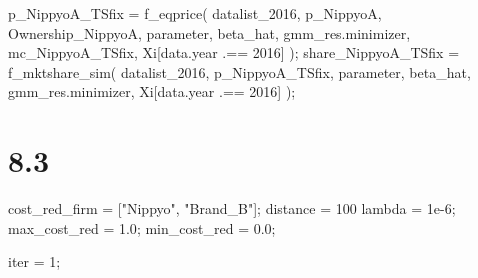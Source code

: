 \documentclass[
  letterpaper,
  DIV=11,
  numbers=noendperiod]{scrreprt}
\newenvironment{Shaded}{\begin{snugshade}}{\end{snugshade}}
\newcommand{\FloatTok}[1]{\textcolor[rgb]{0.68,0.00,0.00}{#1}}
\newcommand{\FunctionTok}[1]{\textcolor[rgb]{0.28,0.35,0.67}{#1}}
\newcommand{\NormalTok}[1]{\textcolor[rgb]{0.00,0.23,0.31}{#1}}
\newcommand{\OperatorTok}[1]{\textcolor[rgb]{0.37,0.37,0.37}{#1}}
\newcommand{\StringTok}[1]{\textcolor[rgb]{0.13,0.47,0.30}{#1}}
\begin{document}
\begin{Shaded}
\begin{Highlighting}[]
\NormalTok{p\_NippyoA\_TSfix }\OperatorTok{=} \FunctionTok{f\_eqprice}\NormalTok{(}
\NormalTok{    datalist\_2016, }
\NormalTok{    p\_NippyoA, }
\NormalTok{    Ownership\_NippyoA, }
\NormalTok{    parameter, }
\NormalTok{    beta\_hat, }
\NormalTok{    gmm\_res.minimizer, }
\NormalTok{    mc\_NippyoA\_TSfix, }
\NormalTok{    Xi[data.year }\OperatorTok{.==} \FloatTok{2016}\NormalTok{]}
\NormalTok{    );}
\NormalTok{share\_NippyoA\_TSfix }\OperatorTok{=} \FunctionTok{f\_mktshare\_sim}\NormalTok{(}
\NormalTok{    datalist\_2016, }
\NormalTok{    p\_NippyoA\_TSfix, }
\NormalTok{    parameter, }
\NormalTok{    beta\_hat, }
\NormalTok{    gmm\_res.minimizer, }
\NormalTok{    Xi[data.year }\OperatorTok{.==} \FloatTok{2016}\NormalTok{]}
\NormalTok{    );}
\end{Highlighting}
\end{Shaded}

\hypertarget{section-19}{%
\section{8.3}\label{section-19}}

\begin{Shaded}
\begin{Highlighting}[]
\NormalTok{cost\_red\_firm }\OperatorTok{=}\NormalTok{ [}\StringTok{"Nippyo"}\NormalTok{, }\StringTok{"Brand\_B"}\NormalTok{];}
\NormalTok{distance }\OperatorTok{=} \FloatTok{100}
\NormalTok{lambda }\OperatorTok{=} \FloatTok{1e{-}6}\NormalTok{;}
\NormalTok{max\_cost\_red }\OperatorTok{=} \FloatTok{1.0}\NormalTok{;}
\NormalTok{min\_cost\_red }\OperatorTok{=} \FloatTok{0.0}\NormalTok{;}

\NormalTok{iter }\OperatorTok{=} \FloatTok{1}\NormalTok{;}
\end{Highlighting}
\end{Shaded}
\end{document}
